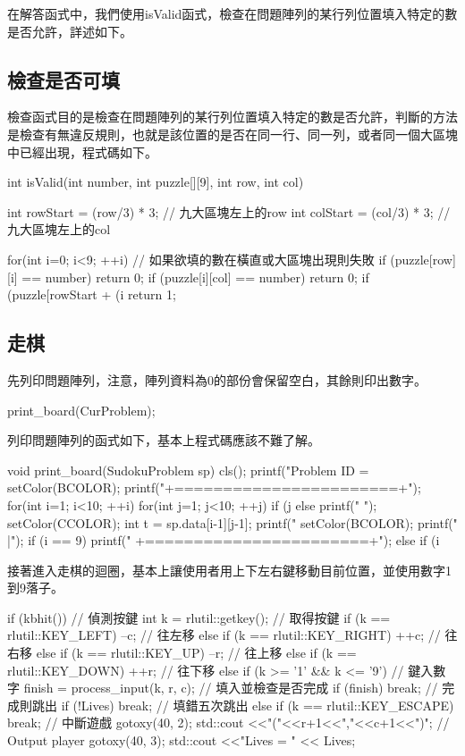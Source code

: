 \documentclass[12pt,a4paper]{article}
\begin{document}
在解答函式中，我們使用isValid函式，檢查在問題陣列的某行列位置填入特定的數是否允許，詳述如下。

\subsection{檢查是否可填}
檢查函式目的是檢查在問題陣列的某行列位置填入特定的數是否允許，判斷的方法是檢查有無違反規則，也就是該位置的是否在同一行、同一列，或者同一個大區塊中已經出現，程式碼如下。
\begin{inside}
int isValid(int number, int puzzle[][9], int row, int col)
{
	int rowStart = (row/3) * 3; // 九大區塊左上的row
	int colStart = (col/3) * 3; // 九大區塊左上的col
	
	for(int i=0; i<9; ++i) // 如果欲填的數在橫直或大區塊出現則失敗
	{
		if (puzzle[row][i] == number) return 0;
		if (puzzle[i][col] == number) return 0;
		if (puzzle[rowStart + (i%
	}
	return 1;
}
\end{inside}

\subsection{走棋}
先列印問題陣列，注意，陣列資料為0的部份會保留空白，其餘則印出數字。
\begin{inside}
print_board(CurProblem);
\end{inside}

列印問題陣列的函式如下，基本上程式碼應該不難了解。
\begin{inside}
void print_board(SudokuProblem sp)
{
	cls();
	printf("\n     Problem ID = %
	setColor(BCOLOR);
	printf("\n +=======================+\n");
	for(int i=1; i<10; ++i) {
		for(int j=1; j<10; ++j) {
			if (j%
			else printf(" ");
			setColor(CCOLOR);
			int t = sp.data[i-1][j-1];
			printf("%
			setColor(BCOLOR);
		}
		printf(" |\n");
		if (i == 9) printf(" +=======================+\n");
		else if (i%
	}
}
\end{inside}

接著進入走棋的迴圈，基本上讓使用者用上下左右鍵移動目前位置，並使用數字1到9落子。
\begin{inside}
if (kbhit()) { // 偵測按鍵
	int k = rlutil::getkey(); // 取得按鍵
	if (k == rlutil::KEY_LEFT) --c; // 往左移
	else if (k == rlutil::KEY_RIGHT) ++c; // 往右移
	else if (k == rlutil::KEY_UP) --r;  // 往上移
	else if (k == rlutil::KEY_DOWN) ++r; // 往下移
	else if (k >= '1' && k <= '9') { // 鍵入數字
		finish = process_input(k, r, c); // 填入並檢查是否完成
		if (finish) break; // 完成則跳出
		if (!Lives) break; // 填錯五次跳出
	} else if (k == rlutil::KEY_ESCAPE) break; // 中斷遊戲
	gotoxy(40, 2); std::cout <<"("<<r+1<<","<<c+1<<")"; // Output player
	gotoxy(40, 3); std::cout <<"Lives = " << Lives;
}
\end{inside}
\end{document}
